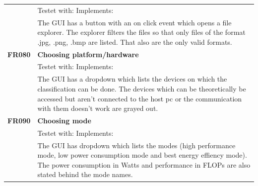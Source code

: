 \documentclass[parskip=full]{scrartcl}
\begin{document}
\begin{tabular}{p{2cm}p{12cm}}
& Testet with: Implements: \\
& The GUI has a button with an on click event which opens a file explorer. The explorer filters the files so that only files of the format .jpg, .png, .bmp are listed. That also are the only valid formats.\\
\textbf{FR080} & \textbf{Choosing platform/hardware}\\
& Testet with: Implements: \\
& The GUI has a dropdown which lists the devices on which the classification can be done. The devices which can be theoretically be accessed but aren't connected to the host pc or the communication with them doesn't work are grayed out. \\
\textbf{FR090} & \textbf{Choosing mode}\\
& Testet with: Implements: \\
& The GUI has dropdown which lists the modes (high performance mode, low power consumption mode and best energy effiency mode). The power consumption in Watts and performance in FLOPs are also stated behind the mode names.
\end{tabular}
\end{document}
